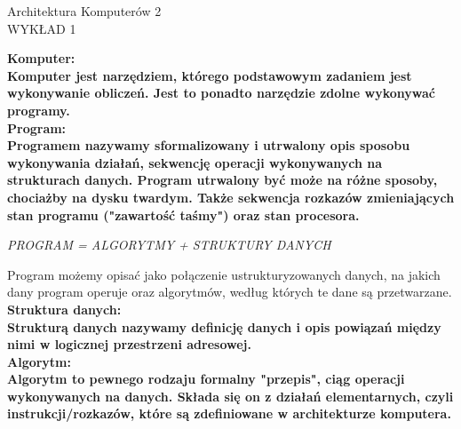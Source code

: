 \documentclass[a4paper,12pt]{article}
\newcommand{\h}[1]{\noindent \bf #1 \rm \\ \noindent}
\begin{document}
\begin{center}
	\LARGE
	Architektura Komputerów 2 \\
	\large
	WYKŁAD 1 
\end{center}
\vspace{1cm}
	
\h{Komputer:}
Komputer jest narzędziem, którego podstawowym zadaniem jest wykonywanie obliczeń. Jest to ponadto narzędzie zdolne wykonywać programy.\\

\h{Program:}
Programem nazywamy sformalizowany i utrwalony opis sposobu wykonywania działań, sekwencję operacji wykonywanych na strukturach danych. Program utrwalony być może na różne sposoby, chociażby na dysku twardym. Także sekwencja rozkazów zmieniających stan programu ("zawartość taśmy") oraz stan procesora.\\

\begin{center}
	\it
	PROGRAM = ALGORYTMY + STRUKTURY DANYCH
\end{center}

\noindent
Program możemy opisać jako połączenie ustrukturyzowanych danych, na jakich dany program operuje oraz algorytmów, według których te dane są przetwarzane. \\

\h{Struktura danych:}
Strukturą danych nazywamy definicję danych i opis powiązań między nimi w logicznej przestrzeni adresowej. \\

\h{Algorytm:}
Algorytm to pewnego rodzaju formalny "przepis", ciąg operacji wykonywanych na danych. Składa się on z działań elementarnych, czyli instrukcji/rozkazów, które są zdefiniowane w architekturze komputera. \\
\end{document}
